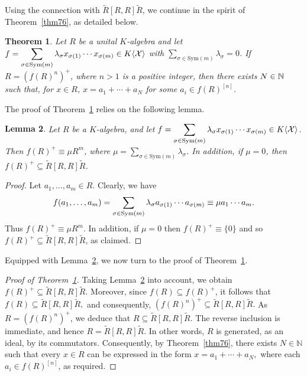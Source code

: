 \documentclass[11pt]{article}
\newtheorem{theorem}{Theorem}
\newtheorem{lemma}[theorem]{Lemma}
\theoremstyle{definition}
\begin{document}
{{{{				
Using the connection with $\widetilde{R}[R, R]\widetilde{R}$, we continue in the spirit of Theorem~\ref{thm76}, as detailed below.

	\begin{theorem}\label{thm80}
	Let $R$ be a unital $K$-algebra and let $\displaystyle f=\sum_{\sigma\in \text{\rm Sym}(m)}\lambda_{\sigma}x_{\sigma(1)}\cdots x_{\sigma(m)}\in K\langle \mathcal{X} \rangle$ with $\displaystyle \sum_{\sigma\in \text{Sym}(m)}\lambda_{\sigma}=0$.
	If $R=(f(R)^n)^+$, where $n>1$ is a positive integer, then there exists $N\in \Bbb N$ such that, for $x\in R$,
	$x=a_1+\cdots+a_N$ for some $a_i\in f(R)^{[n]}$.
\end{theorem}

The proof of Theorem~\ref{thm80} relies on the following lemma.
				
				
				
				
				
				\begin{lemma}\label{lem3}
					Let $R$ be a $K$-algebra, and let $\displaystyle f=\sum_{\sigma\in \text{\rm Sym}(m)}\lambda_{\sigma}x_{\sigma(1)}\cdots x_{\sigma(m)}\in K\langle \mathcal{X} \rangle$.
					Then $f(R)^+\equiv \mu R^m$, where $\displaystyle\mu= \sum_{\sigma\in \text{Sym}(m)}\lambda_{\sigma}$. In addition, if $\mu=0$, then $f(R)^+\subseteq
					\widetilde{R}[R, R]\widetilde{R}$.
				\end{lemma}
				
				\begin{proof}
					Let $a_1,\ldots,a_m\in R$. Clearly, we have
					$$
					f(a_1,\ldots,a_m)= \sum_{\sigma\in \text{\rm Sym}(m)}\lambda_{\sigma}a_{\sigma(1)}\cdots a_{\sigma(m)}\equiv \mu a_1\cdots a_m.
					$$
					Thus $f(R)^+\equiv \mu R^m$. In addition, if $\mu=0$ then $f(R)^+\equiv  \{0\}$ and so $f(R)^+\subseteq
					\widetilde{R}[R, R]\widetilde{R}$, as claimed.
				\end{proof}
				
Equipped with Lemma~\ref{lem3}, we now turn to the proof of Theorem~\ref{thm80}.
				
			
				
				\begin{proof}[Proof of Theorem~\ref{thm80}]
					Taking Lemma~\ref{lem3} into account, we obtain $f(R)^+ \subseteq \widetilde{R}[R,R]\widetilde{R}$. Moreover, since $f(R) \subseteq f(R)^+$, it follows that
					$
					f(R) \subseteq \widetilde{R}[R,R]\widetilde{R},
					$
					and consequently,
					$
					(f(R)^n)^+ \subseteq \widetilde{R}[R,R]\widetilde{R}.
					$
					As $R = (f(R)^n)^+$, we deduce that
					$
					R \subseteq \widetilde{R}[R,R]\widetilde{R}.
					$
					The reverse inclusion is immediate, and hence
					$
					R = \widetilde{R}[R,R]\widetilde{R}.
					$
					In other words, $R$ is generated, as an ideal, by its commutators. Consequently, by Theorem~\ref{thm76}, there exists $N \in \mathbb{N}$ such that every $x \in R$ can be expressed in the form
					$
					x = a_1 + \cdots + a_N,
					$
					where each $a_i \in f(R)^{[n]}$, as required.
				\end{proof}
				
}}}}
\end{document}
